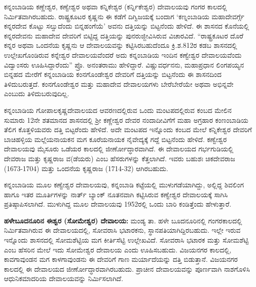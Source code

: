 ಕನ್ನಂಬಾಡಿಯ ಕಣ್ಣೇಶ್ವರ, ಕಣ್ವೇಶ್ವರ ಅಥವಾ ಕನ್ನಿಕೇಶ್ವರ (ಕರ್ನ್ನಿಕೇಶ್ವರ) ದೇವಾಲಯವು ಗಂಗರ ಕಾಲದಲ್ಲಿ ನಿರ್ಮಿತವಾಗಿರಬಹುದು. ರಾಷ್ಟ್ರಕೂಟರ ಕೃಷ್ಣನು ಈ ಕಡೆಗೆ ದಿಗ್ವಿಜಯಕ್ಕೆ ಬಂದಾಗ ‘ಕಣ್ನಂಬಾಡಿಯ ಮಹಾದೇವರ್ಗ್ಗೆ ಕನ್ನರದೇವ ಕೊಟ್ಟು ಸಲ್ವುದೆಂದು ಬಿನ್ನಹಂಗೆಯೆ’ ಅವನು ದತ್ತಿಯನ್ನು ಬಿಟ್ಟನೆಂದು ಹೇಳಿದೆ. ಈ ಶಾಸನದ ಕೊನೆಯಲ್ಲಿ ಕನ್ನರದೇವನು ಮಹಾದೇವ ದೇವರಿಗೆ ಬಿಟ್ಟಿದ್ದ ದತ್ತಿಯನ್ನು ಪುನರುಜ್ಜೀವಿಸಿರುವ ವಿಚಾರವಿದೆ. “ರಾಷ್ಟ್ರಕೂಟರ ದೊರೆ ಕನ್ನರ ಅಥವಾ ಒಂದನೆಯ ಕೃಷ್ಣನು ಆ ದೇವಾಲಯವನ್ನು ಕಟ್ಟಿಸಿರಬಹುದೆಂದೂ ಕ್ರಿ.ಶ.812ರ ಕಡಬ ಶಾಸನದಲ್ಲಿ ಉಲ್ಲೇಖಗೊಂಡಿರುವ ಕನ್ನೇಶ್ವರ ದೇವಾಲಯವೆಂದರೆ ಅದು ಕನ್ನಂಬಾಡಿಯ ಇಂದಿನ ಕಣ್ವೇಶ್ವರ ದೇವಾಲಯವೆಂದು ವಿದ್ವಾಂಸರು ಊಹಿಸಿದ್ದಾರೆಂದು” ಪ್ರೊ. ಅನಂತರಾಮು ಹೇಳಿದ್ದಾರೆ. ವಿಷ್ಣುವರ್ಧನನು, ಮಹಾಪ್ರಧಾನ ಲಿಂಗಪಯ್ಯನ ಬಿನ್ನಹದ ಮೇರೆಗೆ ಕನ್ನಂಬಾಡಿಯ ಕಂನಗೊಂಡೇಶ್ವರ ದೇವರಿಗೆ ದತ್ತಿಯನ್ನು ಬಿಟ್ಟನೆಂದು ಈ ಶಾಸನದಿಂದ ತಿಳಿದುಬರುತ್ತದೆ. ಕಂನಗೊಂಡೇಶ್ವರ ಮತ್ತು ಮಹಾದೇವ ದೇವಾಲಯಗಳು ಬೇರೆಬೇರೆಯೇ ಅಥವಾ ಅಭಿನ್ನವೇ ಎಂಬುದು ತಿಳಿದುಬರುವುದಿಲ್ಲ.

ಕನ್ನಂಬಾಡಿಯ ಗೋಪಾಲಕೃಷ್ಣದೇವಾಲಯದ ಆವರಣದಲ್ಲಿರುವ ಒಂದು ಮಂಟಪದಲ್ಲಿರುವ ಕಂಬದ ಮೇಲಿನ ಸುಮಾರು 12ನೇ ಶತಮಾನದ ಶಾಸನದಲ್ಲಿ ಶ‍್ರೀ ಕಣ್ಣೇಶ್ವರ ದೇವರ ನಂದಾದೀವಿಗೆಗೆ ಮಹಾ ಅಗ್ರಹಾರ ಕಂಣಂಬಾಡಿಯ ತೆಲಿಗ ಕೊತ್ತಳಿಯವರು ದತ್ತಿ ಬಿಟ್ಟರೆಂದು ಹೇಳಿದೆ. ಅದೇ ಮಂಟಪದ ಇನ್ನೊಂದು ಕಂಬದ ಮೇಲೆ ಕನ್ನಿಕೇಶ್ವರ ದೇವರಿಗೆ ಬಾಚಿಹಳ್ಳಿಯ ಮಲ್ಲೆಯನಾಯಕನ ಮಗ ಕೂರೆಯನಾಯಕ ನೈವೇದ್ಯಕ್ಕೆ ಗದ್ದೆ ಬಿಟ್ಟನೆಂದು ಹೇಳಿದೆ. ಕಣ್ವೇಶ್ವರ ದೇವಾಲಯವು ಮೈಸೂರು ಒಡೆಯರ ಕಾಲದಲ್ಲಿ ಜೀರ್ಣೋದ್ಧಾರವಾಗಿದೆ. ಈ ದೇವಾಲಯದ ಗರ್ಭಗುಡಿಯಲ್ಲಿ ದೇವರಾಜ ಮತ್ತು ಕೃಷ್ಣರಾಜ ವ(ಡೆಯರು) ಎಂಬ ಹೆಸರುಗಳನ್ನು ಕೆತ್ತಲಾಗಿದೆ. ಇವರು ಬಹುಶಃ ಚಿಕದೇವರಾಜ (1673-1704) ಮತ್ತು ಒಂದನೆಯ ಕೃಷ್ಣರಾಜ (1714-32) ಆಗಿರಬಹುದು.

ಕನ್ನಂಬಾಡಿಯ ಮೂಲ ಕಣ್ವೇಶ್ವರ ದೇವಾಲಯವು, ಕನ್ನಂಬಾಡಿ ಕಟ್ಟೆಯಲ್ಲಿ ಮುಳುಗಡೆಯಾಗಿದ್ದು, ಅಲ್ಲಿದ್ದ ಶಿವಲಿಂಗ ಹಾಗೂ ಇತರ ಮೂರ್ತಿಗಳನ್ನು ನಾರ್ತ್ ಬ್ಯಾಂಕ್ ನೂತನವಾಗಿ ಕಟ್ಟಿಸಿರುವ ಕಣ್ವೇಶ್ವರ ದೇವಾಲಯಕ್ಕೆ ಸಾಗಿಸಿ ಪ್ರತಿಷ್ಠಾಪಿಸಲಾಗಿದೆ. ಮುಳುಗಿದ್ದ ಮೂಲ ದೇವಾಲಯವು 1952ರಲ್ಲಿ ಒಂದು ಬಾರಿ ಕಂಡಿತ್ತೆಂದು ಹೇಳುತ್ತಾರೆ.

\textbf{ಹಳೇಬೂದನೂರಿನ ಈಶ್ವರ (ಸೋಮೇಶ್ವರ) ದೇವಾಲಯ:} ಮಂಡ್ಯ ತಾ. ಹಳೇ ಬೂದನೂರಿನಲ್ಲಿ ಗಂಗರಕಾಲದಲ್ಲಿ ನಿರ್ಮಿತವಾಗಿರುವ ಈ ದೇವಾಲಯ\-ದಲ್ಲಿ, ಸೋವರಾಸಿ ಭಟಾರಕನು, ಸ್ಥಾನಪತಿಯಾಗಿದ್ದಿರಬಹುದು. ಇಲ್ಲೇ ಇರುವ ಇನ್ನೊಂದು ಶಾಸನದಲ್ಲಿ ಸೋಮಶೆಟ್ಟಿಯ ಮಗ ಕೀರ್ತಿಸೆಟ್ಟಿ ಉಲ್ಲೇಖವಿದೆ. ಸೋವರಾಸಿ ಭಟಾರಕ ಮತ್ತು ಸೋಮಶೆಟ್ಟಿ ಎಂಬ ಹೆಸರಿನ ಮೇಲೆ ಇದು ಸೋಮೇಶ್ವರ ದೇವಾಲಯ ಎಂದು ಊಹಿಸಬಹುದು. ವಿಜಯನಗರ ಕಾಲದಲ್ಲಿ, ಕಾವಗಾವುಂಡನ ಮಗ ಕಾಳಗಾವುಂಡನು ಈ ದೇವರಿಗೆ ಗಾಣ ಮರ್ಯಾದೆಯನ್ನು ದತ್ತಿ ಬಿಡುತ್ತಾನೆ. ವಿಜಯನಗರ ಕಾಲದಲ್ಲಿ ಈ ದೇವಾಲಯದ ಜೀರ್ಣೋದ್ಧಾರವಾಗಿರಬಹುದು. ಪ್ರಾಚೀನ ದೇವಾಲಯವನ್ನು ಪೂರ್ಣವಾಗಿ ನಾಶಗೊಳಿಸಿ ಆಧುನಿಕ\break ಮಾದರಿಯ ದೇವಾಲಯವನ್ನು ನಿರ್ಮಿಸಲಾಗಿದೆ.

